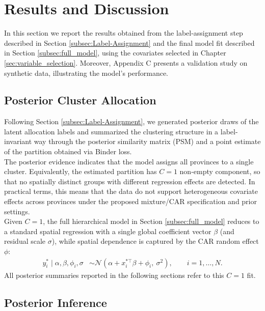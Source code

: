 \section{Results and Discussion}
In this section we report the results obtained from the label-assignment step described in Section \ref{subsec:Label-Assignment} and the final model fit described in Section \ref{subsec:full_model}, using the covariates selected in
Chapter \ref{sec:variable_selection}. Moreover, Appendix C presents a validation study on synthetic data, illustrating the model’s performance.

\subsection{Posterior Cluster Allocation}
\label{subsec:clusters}

Following Section \ref{subsec:Label-Assignment}, we generated posterior draws of the latent allocation labels and summarized the clustering structure in a label-invariant way through the posterior similarity matrix (PSM) and a point estimate of the partition obtained via Binder loss.\\

The posterior evidence indicates that the model assigns all provinces to a single cluster. Equivalently, the estimated partition has $C=1$ non-empty component, so that no spatially distinct groups with different regression effects are detected. In practical terms, this means that the data do not support heterogeneous covariate effects across provinces under the proposed mixture/CAR specification and prior settings.\\

Given $C=1$, the full hierarchical model in Section \ref{subsec:full_model} reduces to a standard spatial regression with a single global coefficient vector $\beta$ (and residual scale $\sigma$), while spatial dependence is captured by the CAR random effect $\phi$:
\begin{align}
y_i^* \mid \alpha,\beta,\phi_i,\sigma &\sim \mathcal{N}\!\left(\alpha + x_i^{*\top}\beta + \phi_i,\ \sigma^2\right),
\qquad i=1,\dots,N.
\end{align}
All posterior summaries reported in the following sections refer to this $C=1$ fit.

\subsection{Posterior Inference}

